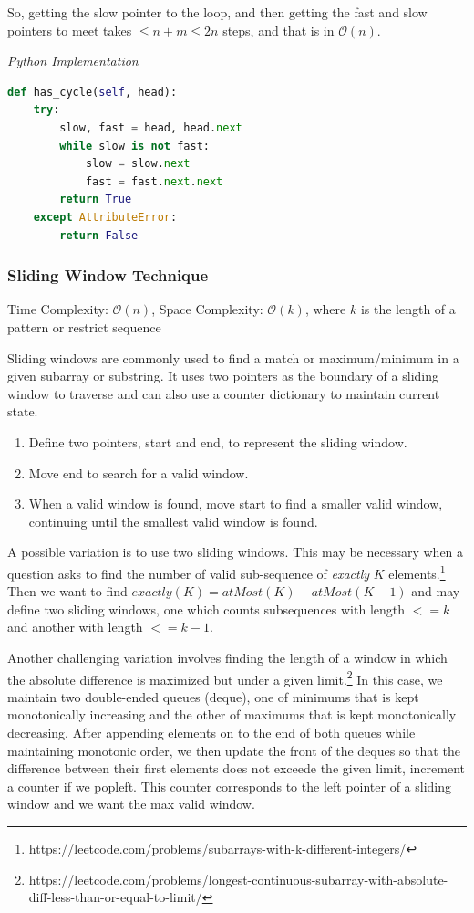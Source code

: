 \documentclass{article}
\newcommand{\bigO}{\mathcal{O}}
\begin{document}
    So, getting the slow pointer to the loop, and then getting the fast and slow pointers to meet takes $\leq n + m \leq 2n$ steps, and that is in $\bigO(n)$.

\vspace{8pt} \emph{Python Implementation}
\begin{lstlisting}[language=Python]
def has_cycle(self, head):
    try:
        slow, fast = head, head.next
        while slow is not fast:
            slow = slow.next
            fast = fast.next.next
        return True
    except AttributeError:
        return False
\end{lstlisting}


    \subsubsection{Sliding Window Technique}
    Time Complexity: $\bigO(n)$, Space Complexity: $\bigO(k)$, where $k$ is the length of a pattern or restrict sequence 
    
    Sliding windows are commonly used to find a match or maximum/minimum in a given subarray or substring. It uses two pointers as the boundary of a sliding window to traverse and can also use a counter dictionary to maintain current state.
    
    \begin{enumerate}
        \item Define two pointers, start and end, to represent the sliding window.
        \item Move end to search for a valid window.
        \item When a valid window is found, move start to find a smaller valid window, continuing until the smallest valid window is found.
    \end{enumerate}
    
    A possible variation is to use two sliding windows. This may be necessary when a question asks to find the number of valid sub-sequence of \textit{exactly} $K$ elements.\footnote{https://leetcode.com/problems/subarrays-with-k-different-integers/} Then we want to find $exactly(K) = atMost(K) - atMost(K-1)$ and may define two sliding windows, one which counts subsequences with length $<= k$ and another with length $<= k-1$.
    
    Another challenging variation involves finding the length of a window in which the absolute difference is maximized but under a given limit.\footnote{https://leetcode.com/problems/longest-continuous-subarray-with-absolute-diff-less-than-or-equal-to-limit/} In this case, we maintain two double-ended queues (deque), one of minimums that is kept monotonically increasing and the other of maximums that is kept monotonically decreasing. After appending elements on to the end of both queues while maintaining monotonic order, we then update the front of the deques so that the difference between their first elements does not exceede the given limit, increment a counter if we popleft. This counter corresponds to the left pointer of a sliding window and we want the max valid window. 
\end{document}
